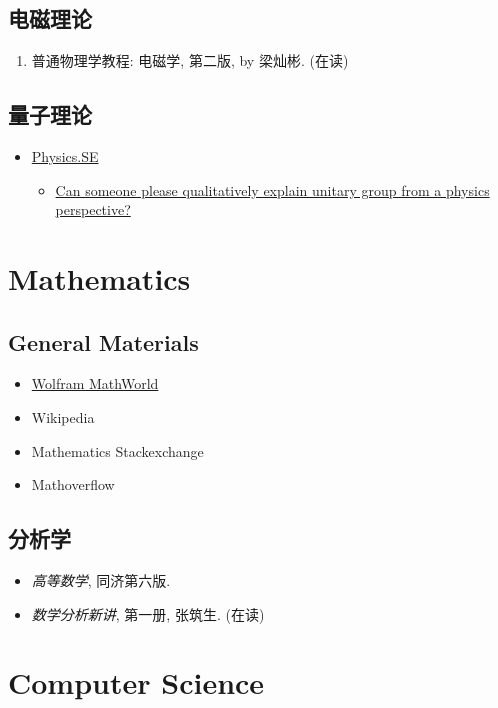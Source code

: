 \documentclass{article}
\newcommand{\book}[1]{\textit{#1}}
\begin{document}
\subsection{电磁理论}
\begin{enumerate}
    \item 普通物理学教程: 电磁学, 第二版, by 梁灿彬. (在读)
\end{enumerate}
\subsection{量子理论}
\begin{itemize}
    \item \href{http://physics.stackexchange.com/}{Physics.SE}
        \begin{itemize}
            \item \href{http://physics.stackexchange.com/questions/133270/can-someone-please-qualitatively-explain-unitary-group-from-a-physics-perspectiv}{Can someone please qualitatively explain unitary group from a physics perspective?}
        \end{itemize}
\end{itemize}
\section{Mathematics}
\subsection{General Materials}
\begin{itemize}
    \item \href{http://mathworld.wolfram.com/}{Wolfram MathWorld}
    \item Wikipedia
    \item Mathematics Stackexchange
    \item Mathoverflow
\end{itemize}
\subsection{分析学}
\begin{itemize}
    \item \book{高等数学}, 同济第六版.
    \item \book{数学分析新讲}, 第一册, 张筑生. (在读)
\end{itemize}
\section{Computer Science}
%
\end{document}
